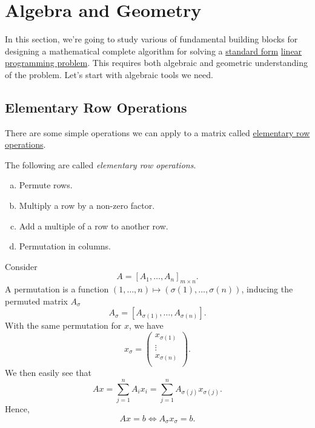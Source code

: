 \chapter{Algebra and Geometry}
In this section, we're going to study various of fundamental building blocks for designing a mathematical complete algorithm for solving a \hyperref[def:standard-form]{standard form} \hyperref[def:general-linear-programming-problem]{linear programming problem}. This requires both algebraic and geometric understanding of the problem. Let's start with algebraic tools we need.

\section{Elementary Row Operations}
There are some simple operations we can apply to a matrix called \hyperref[def:elementary-row-operations]{elementary row operations}.

\begin{definition}\label{def:elementary-row-operations}
	The following are called \emph{elementary row operations}.
	\begin{enumerate}[(a)]
		\item Permute rows.
		\item Multiply a row by a non-zero factor.
		\item Add a multiple of a row to another row.
		\item Permutation in columns.
	\end{enumerate}
\end{definition}

\begin{note}
	Consider
	\[
		A = \left[ A_1, \ldots , A_n \right]_{m\times n} .
	\]
	A permutation is a function \((1, \ldots , n) \mapsto (\sigma(1), \ldots , \sigma(n))\), inducing the permuted matrix \(A_{\sigma}\)
	\[
		A_{\sigma} = \left[ A_{\sigma(1)}, \ldots , A_{\sigma(n)} \right].
	\]
	With the same permutation for \(x\), we have
	\[
		x_{\sigma} = \begin{pmatrix}
			x_{\sigma(1)} \\
			\vdots        \\
			x_{\sigma(n)} \\
		\end{pmatrix}.
	\]
	We then easily see that
	\[
		Ax = \sum\limits_{j=1}^{n} A_i x_i = \sum\limits_{j=1}^{n} A_{\sigma(j)}x_{\sigma(j)}.
	\]
	Hence,
	\[
		Ax = b \iff A_{\sigma} x_{\sigma} = b.
	\]
\end{note}

